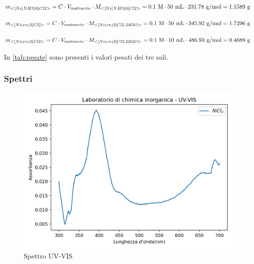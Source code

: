 \[ m_{<[Ni(NH3)6]Cl2>} = C \cdot V_{\text{matraccio}} \cdot M_{<[Ni(NH3)6]Cl2>}  = 0.1 \mathrm{\ M} \cdot 50 \mathrm{\ mL} \cdot 231.78 \mathrm{\ g/mol} = 1.1589 \mathrm{\ g} \]

\[ m_{<[Ni(en)3]Cl2>} = C \cdot V_{\text{matraccio}} \cdot M_{<[Ni(en)3]Cl2.2H2O>}  = 0.1 \mathrm{\ M} \cdot 50 \mathrm{\ mL} \cdot 345.92 \mathrm{\ g/mol} = 1.7296 \mathrm{\ g} \]

\[ m_{<[Ni(en)3]Cl2>} = C \cdot V_{\text{matraccio}} \cdot M_{<[Ni(en)3]Cl2.2H2O>}  = 0.1 \mathrm{\ M} \cdot 10 \mathrm{\ mL} \cdot 486.93 \mathrm{\ g/mol} = 0.4689\mathrm{\ g} \]

In  \autoref{tab:pesate} sono presenti i valori pesati dei tre sali.
\subsubsection{Spettri}


\begin{figure}[ht!]
    \centering
    \includegraphics{Relazione/foto/nicl2uv.png}
    
    \caption{Spettro UV-VIS }
    \label{fig:nicl2uv}
\end{figure}


